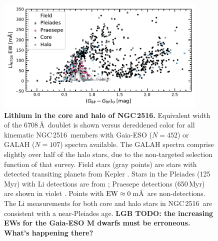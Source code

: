 \documentclass[12pt,twocolumn,tighten]{aastex63}
\newcommand{\cn}{NGC\,2516} %
\begin{document}
\begin{figure}[t]
	\begin{center}
		\leavevmode
			\includegraphics[width=0.9\textwidth]{f5a.pdf}
	\end{center}
	\vspace{-0.7cm}
  \caption{ {\bf Lithium in the core and halo of NGC\,2516.}
  Equivalent width of the 6708\,\AA\ doublet is shown versus
  dereddened color for all kinematic \cn\ members with Gaia-ESO
  ($N=452$) or GALAH ($N=107$) spectra available.  The GALAH spectra
  comprise slightly over half of the halo stars, due to the
  non-targeted selection function of that survey.  Field stars (gray
  points) are stars with detected
  transiting planets from Kepler 
  \citep{berger_identifying_2018}.  Stars in the Pleiades (125\,Myr)
  with Li detections are from \citet{bouvier_pleiades_lirot_2018};
  Praesepe detections (650\,Myr) are shown in violet
  \citep{soderblom_praesepe_1993}.  Points with ${\rm
  EW}\approx0\,$m\AA\ are non-detections.
  The Li measurements for both core and halo stars in \cn\ are
  consistent with a near-Pleiades age.
  {\bf LGB TODO: the increasing EWs for the Gaia-ESO M dwarfs must be erroneous. What's happening there?}
  \label{fig:lithiumcorehalo}
  }
\end{figure}
\end{document}
